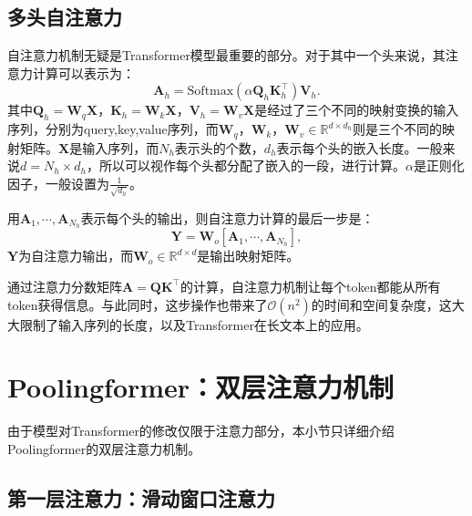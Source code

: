 \subsection{多头自注意力}

自注意力机制无疑是Transformer模型最重要的部分。对于其中一个头来说，其注意力计算可以表示为：
\begin{equation}
 	\mathbf{A}_h = \text{Softmax}(\alpha \mathbf{Q}_h \mathbf{K}_h^\top)\mathbf{V}_h.
 \label{eq:trfselfattn}
 \end{equation}
其中$\mathbf{Q}_h=\mathbf{W}_q\mathbf{X}$，$\mathbf{K}_h=\mathbf{W}_k\mathbf{X}$，$\mathbf{V}_h=\mathbf{W}_v\mathbf{X}$是经过了三个不同的映射变换的输入序列，分别为query,key,value序列，而$\mathbf{W}_q$，$\mathbf{W}_k$，$\mathbf{W}_v\in \mathbb{R}^{d\times d_h}$则是三个不同的映射矩阵。$\mathbf{X}$是输入序列，而$N_h$表示头的个数，$d_h$表示每个头的嵌入长度。一般来说$d=N_h\times d_h$，所以可以视作每个头都分配了嵌入的一段，进行计算。$\alpha$是正则化因子，一般设置为$\frac{1}{\sqrt{d_h}}$。

用$\mathbf{A}_1,\cdots,\mathbf{A}_{N_h}$表示每个头的输出，则自注意力计算的最后一步是：
\begin{equation}
 	\mathbf{Y} = \mathbf{W}_o [\mathbf{A}_1,\cdots,\mathbf{A}_{N_h}],
 \label{eq:trfselfattnout}
 \end{equation}
$\mathbf{Y}$为自注意力输出，而$\mathbf{W}_o \in \mathbb{R}^{d \times d}$是输出映射矩阵。

通过注意力分数矩阵$\mathbf{A}=\mathbf{Q}\mathbf{K}^\top$的计算，自注意力机制让每个token都能从所有token获得信息。与此同时，这步操作也带来了$\mathcal{O}(n^2)$的时间和空间复杂度，这大大限制了输入序列的长度，以及Transformer在长文本上的应用。

\section{Poolingformer：双层注意力机制}
\label{sec:pf}

由于模型对Transformer的修改仅限于注意力部分，本小节只详细介绍Poolingformer的双层注意力机制。

\subsection{第一层注意力：滑动窗口注意力}


